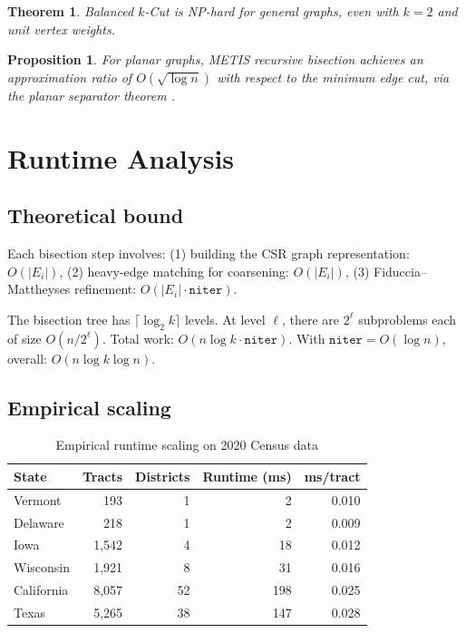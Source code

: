 \documentclass[12pt]{article}
\newtheorem{theorem}{Theorem}
\newtheorem{proposition}{Proposition}
\begin{document}
\begin{theorem}
Balanced $k$-Cut is NP-hard for general graphs, even with $k = 2$ and
unit vertex weights.
\end{theorem}

\begin{proposition}
For planar graphs, METIS recursive bisection achieves an approximation ratio
of $O(\sqrt{\log n})$ with respect to the minimum edge cut, via the planar
separator theorem \citep{lipton1979separator}.
\end{proposition}

\section{Runtime Analysis}

\subsection{Theoretical bound}

Each bisection step involves:
(1) building the CSR graph representation: $O(|E_i|)$,
(2) heavy-edge matching for coarsening: $O(|E_i|)$,
(3) Fiduccia--Mattheyses refinement: $O(|E_i| \cdot \texttt{niter})$.

The bisection tree has $\lceil \log_2 k \rceil$ levels.
At level $\ell$, there are $2^\ell$ subproblems each of size $O(n / 2^\ell)$.
Total work: $O(n \log k \cdot \texttt{niter})$.
With $\texttt{niter} = O(\log n)$, overall: $O(n \log k \log n)$.

\subsection{Empirical scaling}

\begin{table}[h]
\centering
\caption{Empirical runtime scaling on 2020 Census data}
\begin{tabular}{lrrrr}
\toprule
State & Tracts & Districts & Runtime (ms) & ms/tract \\
\midrule
Vermont    &   193 &  1 &    2 & 0.010 \\
Delaware   &   218 &  1 &    2 & 0.009 \\
Iowa       & 1{,}542 &  4 &   18 & 0.012 \\
Wisconsin  & 1{,}921 &  8 &   31 & 0.016 \\
California & 8{,}057 & 52 &  198 & 0.025 \\
Texas      & 5{,}265 & 38 &  147 & 0.028 \\
\bottomrule
\end{tabular}
\end{table}
\end{document}

